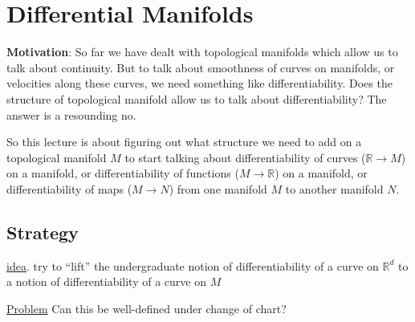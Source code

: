 \section{Differential Manifolds}
\begin{framed}
\textbf{Motivation}: So far we have dealt with topological manifolds which allow us to talk about continuity. But to talk about smoothness of curves on manifolds, or velocities along these curves, we need something like differentiability. Does the structure of topological manifold allow us to talk about differentiability? The answer is a resounding no.

So this lecture is about figuring out what structure we need to add on a topological manifold $M$ to start talking about differentiability of curves ($\mathbb{R} \to M$) on a manifold, or differentiability of functions ($M \to \mathbb{R}$) on a manifold, or differentiability of maps ($M \to N$) from one manifold $M$ to another manifold $N$. 
\end{framed}

\subsection{Strategy}


\underline{idea}. try to ``lift'' the undergraduate notion of differentiability of a curve on $\mathbb{R}^d$ to a notion of differentiability of a curve on $M$

\underline{Problem} Can this be well-defined under change of chart?


